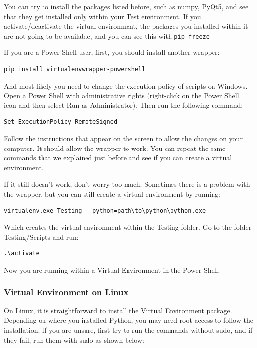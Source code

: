 You can try to install the packages listed before, such as numpy, PyQt5,  and see that they get installed only within your Test environment. If you activate/deactivate the virtual environment, the packages you installed within it are not going to be available, and you can see this with \texttt{pip freeze}


If you are a Power Shell user, first, you should install another wrapper:

\begin{verbatim}
pip install virtualenvwrapper-powershell
\end{verbatim}

And most likely you need to change the execution policy of scripts on Windows. Open a Power Shell with administrative rights (right-click on the Power Shell icon and then select Run as Administrator). Then run the following command:

\begin{verbatim}
Set-ExecutionPolicy RemoteSigned
\end{verbatim}

Follow the instructions that appear on the screen to allow the changes on your computer. It should allow the wrapper to work. You can repeat the same commands that we explained just before and see if you can create a virtual environment.

If it still doesn't work, don't worry too much. Sometimes there is a problem with the wrapper, but you can still create a virtual environment by running:
\begin{verbatim}
virtualenv.exe Testing --python=path\to\python\python.exe
\end{verbatim}

Which creates the virtual environment within the Testing folder. Go to the folder Testing/Scripts and run:
\begin{verbatim}
.\activate
\end{verbatim}

Now you are running within a Virtual Environment in the Power Shell.

\subsubsection{Virtual Environment on Linux}
On Linux, it is straightforward to install the Virtual Environment package. Depending on where you installed Python, you may need root access to follow the installation. If you are unsure, first try to run the commands without sudo, and if they fail, run them with sudo as shown below:

